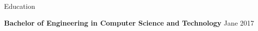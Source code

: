 \documentclass{resume} %
\begin{document}

\begin{rSection}{Education}

  {\bf Bachelor of Engineering in Computer Science and Technology} \hfill {Jane 2017}

\end{rSection}

\end{document}
